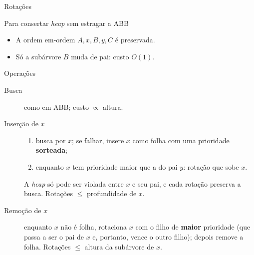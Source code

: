 \documentclass[aspectratio=169,11pt]{beamer}
\newcommand{\tri}[3]{%
  \draw (#1,#2) -- ++(-.45,-.9) -- ++(.9,0) -- cycle;
  \node at (#1,#2-.65) {#3};}
\theoremstyle{definition}
\begin{document}
\begin{frame}{Rotações}

  
  Para consertar \textit{heap} sem estragar a ABB

  \vfill

  \centering

  \medskip
  \begin{itemize}
  \item A ordem em-ordem $A,x,B,y,C$ é preservada.
  \item Só a subárvore $B$ muda de pai: custo $O(1)$.
  \end{itemize}
\end{frame}

\begin{frame}{Operações}
  \begin{description}
  \item[Busca] como em ABB; custo $\propto$ altura.
  \pause
  \item[Inserção de $x$]
    \begin{enumerate}
    \item busca por $x$; se falhar, insere $x$ como folha com uma
      prioridade \textbf{sorteada};
    \item enquanto $x$ tem prioridade maior que a do pai $y$: rotação
      que sobe $x$.
    \end{enumerate}
    {\small
    A \emph{heap} só pode ser violada entre $x$ e seu pai, e cada
    rotação preserva a busca. Rotações $\le$ profundidade de $x$.}
  \pause
  \item[Remoção de $x$] enquanto $x$ não é folha, rotaciona $x$ com o
    filho de \textbf{maior} prioridade (que passa a ser o pai de $x$
    e, portanto, vence o outro filho); depois remove a folha.
    Rotações $\le$ altura da subárvore de $x$.
  \end{description}
\end{frame}
\end{document}
